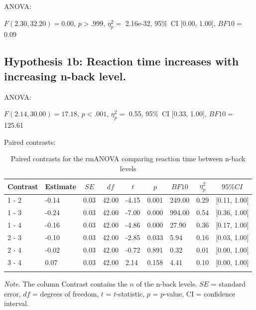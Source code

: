 \documentclass[
  man,floatsintext]{apa6}
\begin{document}
ANOVA:

\(F(2.30, 32.20) = 0.00\), \(p > .999\), \(\eta_{p}^{2}=\) 2.16e-32, 95\%~CI {[}0.00, 1.00{]}, \(BF10=\) 0.09

\newpage

\hypertarget{hypothesis-1b-reaction-time-increases-with-increasing-n-back-level.}{%
\subsection{Hypothesis 1b: Reaction time increases with increasing n-back level.}\label{hypothesis-1b-reaction-time-increases-with-increasing-n-back-level.}}

ANOVA:

\(F(2.14, 30.00) = 17.18\), \(p < .001\), \(\eta_{p}^{2}=\) 0.55, 95\%~CI {[}0.33, 1.00{]}, \(BF10=\) 125.61

Paired contrasts:

\begin{table}[H]

\begin{center}
\begin{threeparttable}

\caption{\label{tab:unnamed-chunk-1}Paired contrasts for the rmANOVA comparing reaction time between n-back levels}

\begin{tabular}{lllllllll}
\toprule
Contrast & \multicolumn{1}{c}{Estimate} & \multicolumn{1}{c}{$SE$} & \multicolumn{1}{c}{$df$} & \multicolumn{1}{c}{$t$} & \multicolumn{1}{c}{$p$} & \multicolumn{1}{c}{$BF10$} & \multicolumn{1}{c}{$\eta_{p}^{2}$} & \multicolumn{1}{c}{$95\% CI$}\\
\midrule
1 - 2 & -0.14 & 0.03 & 42.00 & -4.15 & 0.001 & 249.00 & 0.29 & {}[0.11, 1.00]\\
1 - 3 & -0.24 & 0.03 & 42.00 & -7.00 & 0.000 & 994.00 & 0.54 & {}[0.36, 1.00]\\
1 - 4 & -0.16 & 0.03 & 42.00 & -4.86 & 0.000 & 27.90 & 0.36 & {}[0.17, 1.00]\\
2 - 3 & -0.10 & 0.03 & 42.00 & -2.85 & 0.033 & 5.94 & 0.16 & {}[0.03, 1.00]\\
2 - 4 & -0.02 & 0.03 & 42.00 & -0.72 & 0.891 & 0.32 & 0.01 & {}[0.00, 1.00]\\
3 - 4 & 0.07 & 0.03 & 42.00 & 2.14 & 0.158 & 4.41 & 0.10 & {}[0.00, 1.00]\\
\bottomrule
\addlinespace
\end{tabular}

\begin{tablenotes}[para]
\normalsize{\textit{Note.} The column Contrast contains the $n$ of the n-back levels. $SE$ = standard error, $df$ = degrees of freedom, $t$ = $t$-statistic, $p$ = $p$-value, CI = confidence interval.}
\end{tablenotes}

\end{threeparttable}
\end{center}

\end{table}
\end{document}
